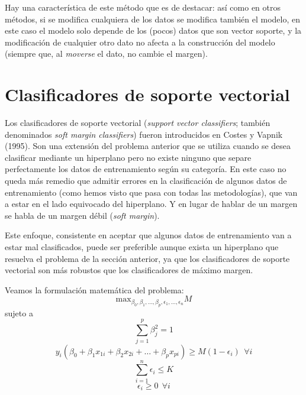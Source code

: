 \documentclass[
]{book}
\theoremstyle{break}
\theoremstyle{definition}
\theoremstyle{definition}
\theoremstyle{definition}
\theoremstyle{remark}
\begin{document}
Hay una característica de este método que es de destacar: así como en otros métodos, si se modifica cualquiera de los datos se modifica también el modelo, en este caso el modelo solo depende de los (pocos) datos que son vector soporte, y la modificación de cualquier otro dato no afecta a la construcción del modelo (siempre que, al \emph{moverse} el dato, no cambie el margen).

\hypertarget{clasificadores-de-soporte-vectorial}{%
\section{Clasificadores de soporte vectorial}\label{clasificadores-de-soporte-vectorial}}

Los clasificadores de soporte vectorial (\emph{support vector classifiers}; también denominados \emph{soft margin classifiers}) fueron introducidos en Costes y Vapnik (1995). Son una extensión del problema anterior que se utiliza cuando se desea clasificar mediante un hiperplano pero no existe ninguno que separe perfectamente los datos de entrenamiento según su categoría. En este caso no queda más remedio que admitir errores en la clasificación de algunos datos de entrenamiento (como hemos visto que pasa con todas las metodologías), que van a estar en el lado equivocado del hiperplano. Y en lugar de hablar de un margen se habla de un margen débil (\emph{soft margin}).

Este enfoque, consistente en aceptar que algunos datos de entrenamiento van a estar mal clasificados, puede ser preferible aunque exista un hiperplano que resuelva el problema de la sección anterior, ya que los clasificadores de soporte vectorial son más robustos que los clasificadores de máximo margen.

Veamos la formulación matemática del problema:
\[\mbox{max}_{\beta_0, \beta_1,\ldots, \beta_p, \epsilon_1,\ldots, \epsilon_n} M\]
sujeto a
\[\sum_{j=1}^p \beta_j^2 = 1\]
\[ y_i(\beta_0 + \beta_1 x_{1i} + \beta_2 x_{2i} + \ldots + \beta_p x_{pi}) \ge M(1 - \epsilon_i) \ \ \forall i\]
\[\sum_{i=1}^n \epsilon_i \le K\]
\[\epsilon_i \ge 0 \ \ \forall i\]
\end{document}
